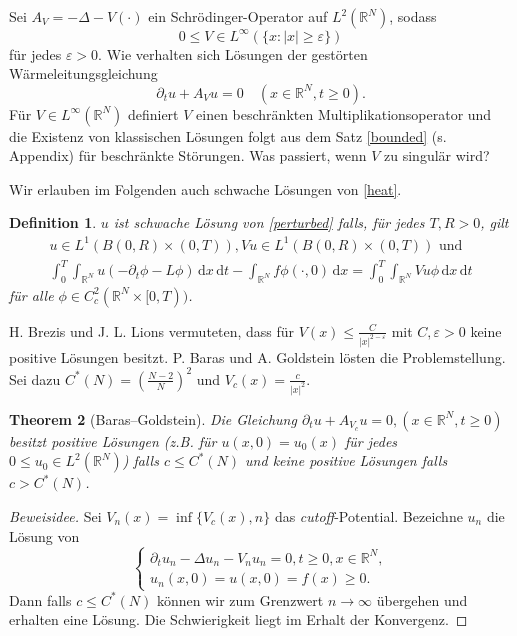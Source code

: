 \documentclass[11pt]{article}
\newtheorem{thm}{Theorem}
\newtheorem{df}[thm]{Definition}
\theoremstyle{break}
\begin{document}
Sei $A_V= -\Delta - V(\cdot)$ ein Schr\"odinger-Operator auf $L^2(\mathbb R^N)$, sodass
\begin{equation}
0\le V\in L^\infty(\{x:|x|\ge \varepsilon\})
\end{equation}\label{perturbed}
f\"ur jedes $\varepsilon>0$. Wie verhalten sich L\"osungen der gest\"orten W\"armeleitungsgleichung 
\begin{equation}
\partial_t u +A_V u =0\quad (x\in \mathbb R^N, t\ge 0).
\end{equation}
F\"ur $V\in L^\infty(\mathbb R^N)$ definiert $V$ einen beschr\"ankten Multiplikationsoperator und die Existenz von klassischen L\"osungen folgt aus dem Satz \ref{bounded} (s. Appendix) f\"ur beschr\"ankte St\"orungen. %
Was passiert, wenn $V$ zu singul\"ar wird?

Wir erlauben im Folgenden auch schwache L\"osungen von \eqref{heat}. \vspace{.25cm}
\begin{df}
$u$ ist schwache L\"osung von \eqref{perturbed} falls, f\"ur jedes $T, R>0$, gilt
\begin{gather}
u\in L^1(B(0,R) \times (0,T)), Vu \in L^1(B(0,R)\times (0,T)) \text{ und }\\
\int_0^T \int_{\mathbb R^N} u (-\partial_t \phi - L\phi) \, \mathrm dx \, \mathrm dt - \int_{\mathbb R^N} f \phi(\cdot, 0) \, \mathrm dx = \int_0^T \int_{\mathbb R^N} V u \phi \, \mathrm dx \, \mathrm dt
\end{gather}
f\"ur alle $\phi \in C_c^2(\mathbb R^N\times [0,T))$.
\end{df}

H. Brezis und J. L. Lions vermuteten, dass f\"ur $V(x) \le \frac{C}{|x|^{2-\varepsilon}}$ mit $C, \varepsilon>0$ keine positive L\"osungen besitzt. P. Baras und A. Goldstein l\"osten die Problemstellung.  Sei dazu $C^*(N)=( \tfrac{N-2}{N} )^2$ und $V_c(x) = \frac{c}{|x|^2}$. \vspace{.25cm}

\begin{thm}[Baras--Goldstein]
Die Gleichung  $\partial_t u + A_{V_c} u =0, (x\in \mathbb R^N, t\ge0)$ besitzt positive L\"osungen (z.B. f\"ur $u(x,0)=u_0(x)$ f\"ur jedes $0\le u_0\in L^2(\mathbb R^N)$) falls $c\le C^*(N)$ und keine positive L\"osungen falls $c>C^*(N)$.
\end{thm}
\begin{proof}[Beweisidee]
Sei $V_n(x)=\inf\{V_c(x), n\}$ das \emph{cutoff}-Potential. Bezeichne $u_n$ die L\"osung von
\begin{equation}\label{cutoff}
\begin{cases}
\partial_t u_n - \Delta u_n - V_n u_n =0, t\ge 0, x\in \mathbb R^N,\\
u_n(x,0)=u(x,0)=f(x)\ge 0.
\end{cases}
\end{equation}
Dann falls $c\le C^*(N)$ k\"onnen wir zum Grenzwert $n\to \infty$ \"ubergehen und erhalten eine L\"osung.  Die Schwierigkeit liegt im Erhalt der Konvergenz.
\end{proof}
\end{document}
